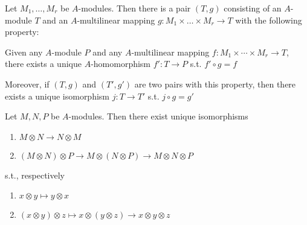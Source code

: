 \documentclass[11pt]{article}
\begin{document}
\begin{proposition}[]
Let \(M_1,\dots,M_r\) be \(A\)-modules. Then there is a pair \((T,g)\) consisting of
an \(A\)-module \(T\) and an \(A\)-multilinear mapping \(g:M_1\times\dots\times M_r\to T\) with the following
property:

Given any \(A\)-module \(P\) and any \(A\)-multilinear mapping \(f:M_1\times\cdots\times M_r\to T\), there exists a
unique \(A\)-homomorphism \(f':T\to P\) s.t. \(f'\circ g=f\)

Moreover, if \((T,g)\) and \((T',g')\) are two pairs with this property, then there exists a
unique isomorphism \(j:T\to T'\) s.t. \(j\circ g=g'\)
\end{proposition}

\begin{proposition}[]
Let \(M,N,P\) be \(A\)-modules. Then there exist unique isomorphisms
\begin{enumerate}
\item \(M\otimes N\to N\otimes M\)
\item \((M\otimes N)\otimes P\to M\otimes(N\otimes P)\to M\otimes N\otimes P\)
\end{enumerate}


s.t., respectively
\begin{enumerate}
\item \(x\otimes y\mapsto y\otimes x\)
\item \((x\otimes y)\otimes z\mapsto x\otimes(y\otimes z)\to x\otimes y\otimes z\)
\end{enumerate}
\end{proposition}
\end{document}

